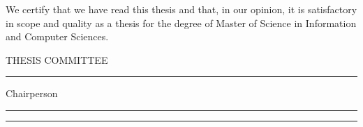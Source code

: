 
%


\newpage

\par\vspace*{1.0in}


\noindent We certify that we have read this thesis and that, in our
opinion, it is satisfactory in scope and quality as a thesis for the
degree of Master of Science in Information and Computer Sciences.

\vspace*{0.8in}

\begin{flushright}

THESIS COMMITTEE\ \ \ \ \ \ 

\vspace{0.2in}

\rule{2.2in}{.01in}

\end{flushright}

\hspace{4.1in} Chairperson

\begin{flushright}
\rule{2.2in}{.01in}
\end{flushright}

\begin{flushright}
\vspace{0.15in}
\rule{2.2in}{.01in}
\end{flushright}
\vfill


%
